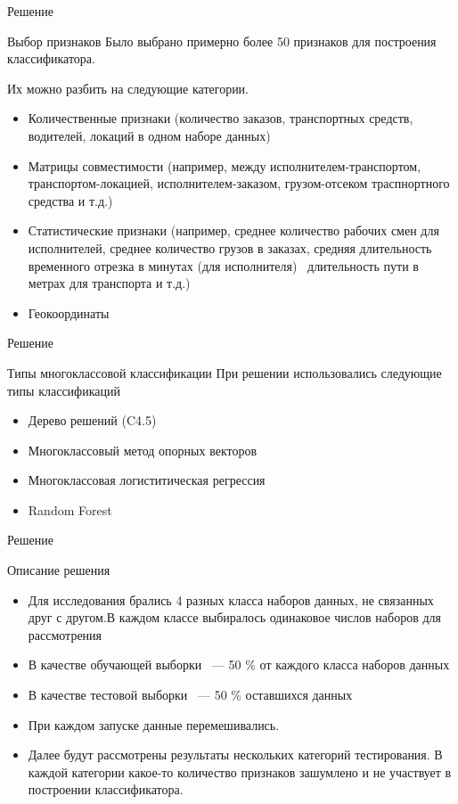 \documentclass{beamer}
\begin{document}
\begin{frame}{Решение}
\begin{block}{Выбор признаков}
Было выбрано примерно более 50 признаков для построения классификатора.

Их можно разбить на следующие категории.

\begin{itemize}
\item Количественные признаки (количество заказов, транспортных средств, водителей, локаций в одном наборе данных)
\item Матрицы совместимости (например, между исполнителем-транспортом, транспортом-локацией, исполнителем-заказом, грузом-отсеком траспнортного средства и т.д.)
\item Статистические признаки (например, среднее количество рабочих смен для исполнителей, среднее количество грузов в заказах, средняя длительность временного отрезка в минутах (для исполнителя) \ длительность пути в метрах для транспорта и т.д.)
\item Геокоординаты
\end{itemize}
\end{block}
\end{frame}

\begin{frame}{Решение}
\begin{block}{Типы многоклассовой классификации}
При решении использовались следующие типы классификаций

\begin{itemize}
\item Дерево решений (C4.5)
\item Многоклассовый метод опорных векторов
\item Многоклассовая логиститическая регрессия
\item Random Forest
\end{itemize}
\end{block}
\end{frame}

\begin{frame}{Решение}
\begin{block}{Описание решения }
\begin{itemize}
	\item Для исследования брались 4 разных класса наборов данных, не связанных друг с другом.В каждом классе выбиралось одинаковое числов наборов для рассмотрения
	\item В качестве обучающей выборки ~--- 50 \% от каждого класса наборов данных
	\item В качестве тестовой выборки ~--- 50 \% оставшихся данных
	\item При каждом запуске данные перемешивались.
	\item Далее будут рассмотрены результаты нескольких категорий тестирования. В каждой категории какое-то количество признаков зашумлено и не участвует в построении классификатора.
\end{itemize}
\end{block}
\end{frame}
\end{document}
